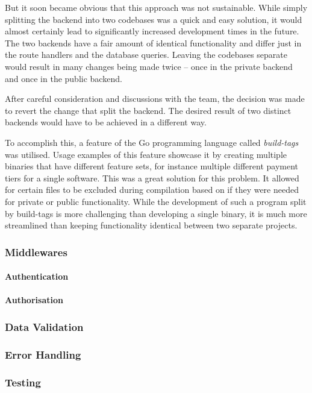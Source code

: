 But it soon became obvious that this approach was not sustainable. While simply
splitting the backend into two codebases was a quick and easy solution, it would
almost certainly lead to significantly increased development times in the
future. The two backends have a fair amount of identical functionality and
differ just in the route handlers and the database queries. Leaving the
codebases separate would result in many changes being made twice -- once in the
private backend and once in the public backend.

After careful consideration and discussions with the team, the decision was made
to revert the change that split the backend. The desired result of two distinct
backends would have to be achieved in a different way.

To accomplish this, a feature of the Go programming language called
\textit{build-tags} was utilised. Usage examples of this feature showcase it by
creating multiple binaries that have different feature sets, for instance
multiple different payment tiers for a single software. This was a great
solution for this problem. It allowed for certain files to be excluded during
compilation based on if they were needed for private or public functionality.
While the development of such a program split by build-tags is more challenging
than developing a single binary, it is much more streamlined than keeping
functionality identical between two separate projects.

\subsubsection{Middlewares}
\paragraph{Authentication}
\paragraph{Authorisation}
\subsubsection{Data Validation}
\subsubsection{Error Handling}
\subsubsection{Testing}